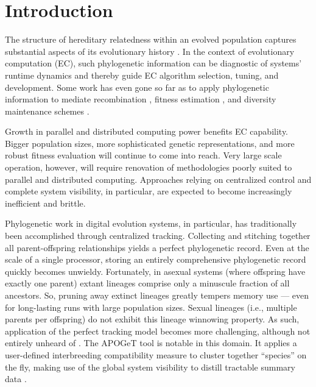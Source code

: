 \section{Introduction} \label{sec:introduction}

The structure of hereditary relatedness within an evolved population captures substantial aspects of its evolutionary history \citep{dolson2019modes}.
In the context of evolutionary computation (EC), such phylogenetic information can be diagnostic of systems' runtime dynamics and thereby guide EC algorithm selection, tuning, and development.
Some work has even gone so far as to apply phylogenetic information to mediate recombination \citep{stanley2002evolving}, fitness estimation \citep{lalejini2023phylogeny}, and diversity maintenance schemes \citep{burke2003increased,murphy2008simple}.

Growth in parallel and distributed computing power benefits EC capability.
Bigger population sizes, more sophisticated genetic representations, and more robust fitness evaluation will continue to come into reach.
Very large scale operation, however, will require renovation of methodologies poorly suited to parallel and distributed computing.
Approaches relying on centralized control and complete system visibility, in particular, are expected to become increasingly inefficient and brittle.

Phylogenetic work in digital evolution systems, in particular, has traditionally been accomplished through centralized tracking.
Collecting and stitching together all parent-offspring relationships yields a perfect phylogenetic record.
Even at the scale of a single processor, storing an entirely comprehensive phylogenetic record quickly becomes unwieldy.
Fortunately, in asexual systems (where offspring have exactly one parent) extant lineages comprise only a minuscule fraction of all ancestors.
So, pruning away extinct lineages greatly tempers memory use --- even for long-lasting runs with large population sizes.
Sexual lineages (i.e., multiple parents per offspring) do not exhibit this lineage winnowing property.
As such, application of the perfect tracking model becomes more challenging, although not entirely unheard of \citep{mcphee2018detailed,mcphee2016using,burlacu2013visualization}.
The APOGeT tool is notable in this domain.
It applies a user-defined interbreeding compatibility measure to cluster together ``species'' on the fly, making use of the global system visibility to distill tractable summary data \citep{godin2019apoget}.

